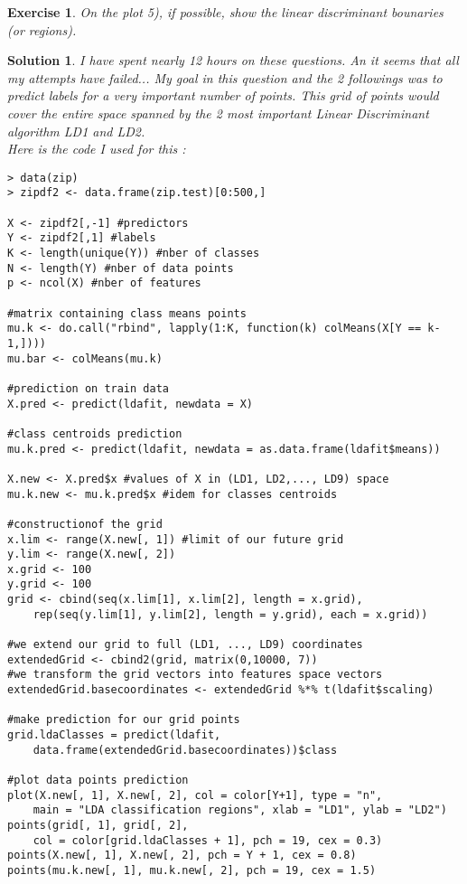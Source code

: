 \documentclass[12pt,a4paper]{article}
\newtheorem{exercise}{Exercise}
\newtheorem{solution}{Solution}
\begin{document}
\begin{exercise}
On the plot 5), if possible, show the linear discriminant bounaries (or regions).
\end{exercise}
\begin{solution}
I have spent nearly 12 hours on these questions. An it seems that all my attempts have failed... My goal in this question and the 2 followings was to predict labels for a very important number of points. This grid of points would cover the entire space spanned by the 2 most important Linear Discriminant algorithm LD1 and LD2.\\

Here is the code I used for this : 
\begin{verbatim}
> data(zip)
> zipdf2 <- data.frame(zip.test)[0:500,]

X <- zipdf2[,-1] #predictors 
Y <- zipdf2[,1] #labels
K <- length(unique(Y)) #nber of classes
N <- length(Y) #nber of data points
p <- ncol(X) #nber of features

#matrix containing class means points
mu.k <- do.call("rbind", lapply(1:K, function(k) colMeans(X[Y == k-1,]))) 
mu.bar <- colMeans(mu.k)

#prediction on train data
X.pred <- predict(ldafit, newdata = X) 

#class centroids prediction
mu.k.pred <- predict(ldafit, newdata = as.data.frame(ldafit$means)) 

X.new <- X.pred$x #values of X in (LD1, LD2,..., LD9) space 
mu.k.new <- mu.k.pred$x #idem for classes centroids

#constructionof the grid
x.lim <- range(X.new[, 1]) #limit of our future grid
y.lim <- range(X.new[, 2])
x.grid <- 100
y.grid <- 100
grid <- cbind(seq(x.lim[1], x.lim[2], length = x.grid), 
	rep(seq(y.lim[1], y.lim[2], length = y.grid), each = x.grid))

#we extend our grid to full (LD1, ..., LD9) coordinates
extendedGrid <- cbind2(grid, matrix(0,10000, 7)) 
#we transform the grid vectors into features space vectors
extendedGrid.basecoordinates <- extendedGrid %*% t(ldafit$scaling) 

#make prediction for our grid points
grid.ldaClasses = predict(ldafit, 
	data.frame(extendedGrid.basecoordinates))$class

#plot data points prediction
plot(X.new[, 1], X.new[, 2], col = color[Y+1], type = "n", 
	main = "LDA classification regions", xlab = "LD1", ylab = "LD2")
points(grid[, 1], grid[, 2], 
	col = color[grid.ldaClasses + 1], pch = 19, cex = 0.3)
points(X.new[, 1], X.new[, 2], pch = Y + 1, cex = 0.8)
points(mu.k.new[, 1], mu.k.new[, 2], pch = 19, cex = 1.5)
\end{verbatim}


\end{solution}
\end{document}
